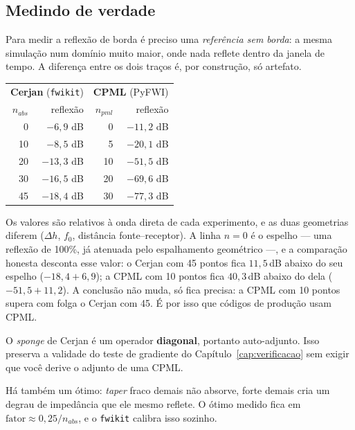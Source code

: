 \documentclass[11pt,a4paper,oneside]{report}
\newcommand{\arq}[1]{\texttt{\small #1}}
\begin{document}
\subsection*{Medindo de verdade}

Para medir a reflexão de borda é preciso uma \emph{referência sem borda}:
a mesma simulação num domínio muito maior, onde nada reflete dentro da janela
de tempo. A diferença entre os dois traços é, por construção, só artefato.

\begin{center}
\begin{tabular}{@{}rrrr@{}}
\toprule
\multicolumn{2}{c}{\textbf{Cerjan} (\arq{fwikit})} & \multicolumn{2}{c}{\textbf{CPML} (PyFWI)} \\
$n_{abs}$ & reflexão & $n_{pml}$ & reflexão \\
\midrule
0  & $-6{,}9$ dB  & 0  & $-11{,}2$ dB \\
10 & $-8{,}5$ dB  & 5  & $-20{,}1$ dB \\
20 & $-13{,}3$ dB & 10 & $-51{,}5$ dB \\
30 & $-16{,}5$ dB & 20 & $-69{,}6$ dB \\
45 & $-18{,}4$ dB & 30 & $-77{,}3$ dB \\
\bottomrule
\end{tabular}
\end{center}

Os valores são relativos à onda direta de cada experimento, e as duas
geometrias diferem ($\Delta h$, $f_0$, distância fonte--receptor). A linha
$n=0$ é o espelho --- uma reflexão de 100\%, já atenuada pelo espalhamento
geométrico ---, e a comparação honesta desconta esse valor: o Cerjan com 45
pontos fica $11{,}5$\,dB abaixo do seu espelho ($-18{,}4+6{,}9$); a CPML com
10 pontos fica $40{,}3$\,dB abaixo do dela ($-51{,}5+11{,}2$). A conclusão não
muda, só fica precisa: a CPML com 10 pontos supera com folga o Cerjan com 45.
É por isso que códigos de produção usam CPML.

\begin{pratica}
O \emph{sponge} de Cerjan é um operador \textbf{diagonal}, portanto
auto-adjunto. Isso preserva a validade do teste de gradiente do
Capítulo~\ref{cap:verificacao}
sem exigir que você derive o adjunto de uma CPML.

Há também um ótimo: \emph{taper} fraco demais não absorve, forte demais cria
um degrau de impedância que ele mesmo reflete. O ótimo medido fica em
$\text{fator} \approx 0{,}25/n_{abs}$, e o \arq{fwikit} calibra isso sozinho.
\end{pratica}
\end{document}
